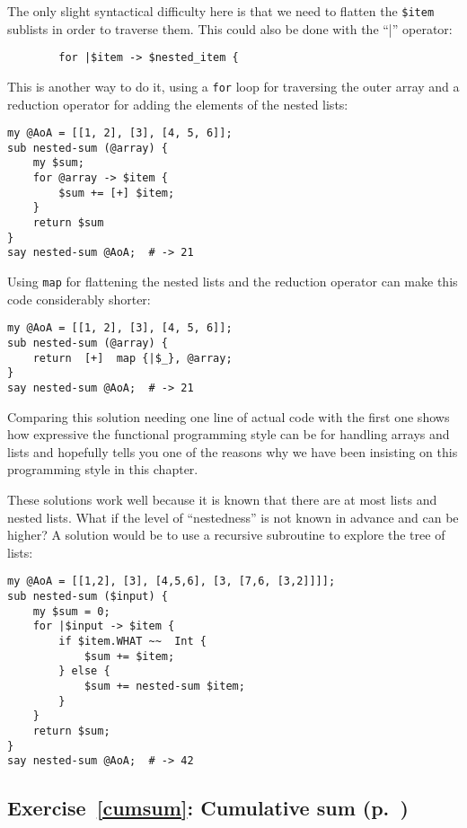 {The only slight syntactical difficulty here is that 
we need to flatten the \verb'$item' sublists in order 
to traverse them. This could also be done with the ``|'' 
operator:
\begin{verbatim}
        for |$item -> $nested_item {
\end{verbatim}

This is another way to do it, using a {\tt for} loop for 
traversing the outer array and a reduction operator 
for adding the elements of the nested lists:

\begin{verbatim}
my @AoA = [[1, 2], [3], [4, 5, 6]];
sub nested-sum (@array) { 
    my $sum; 
    for @array -> $item { 
        $sum += [+] $item;
    } 
    return $sum
}
say nested-sum @AoA;  # -> 21
\end{verbatim}

Using {\tt map} for flattening the nested lists and 
the reduction operator can make this code considerably 
shorter:

\begin{verbatim}
my @AoA = [[1, 2], [3], [4, 5, 6]];
sub nested-sum (@array) { 
    return  [+]  map {|$_}, @array;
}
say nested-sum @AoA;  # -> 21
\end{verbatim}

Comparing this solution needing one line of actual code 
with the first one shows how expressive the functional 
programming style can be for handling arrays and lists 
and hopefully tells you one of the reasons why we have 
been insisting on this programming style in this 
chapter.

These solutions work well because it is known that there 
are at most lists and nested lists. What if the level 
of ``nestedness'' is not known in advance and can be 
higher? A solution would be to use a recursive 
subroutine to explore the tree of lists:

\begin{verbatim}
my @AoA = [[1,2], [3], [4,5,6], [3, [7,6, [3,2]]]];
sub nested-sum ($input) { 
    my $sum = 0; 
    for |$input -> $item { 
        if $item.WHAT ~~  Int {
            $sum += $item;
        } else {
            $sum += nested-sum $item;
        }
    } 
    return $sum;
}
say nested-sum @AoA;  # -> 42
\end{verbatim}

\subsection{Exercise~\ref{cumsum}: Cumulative sum (p.~\pageref{cumsum})}
\label{sol_cumsum}

}
